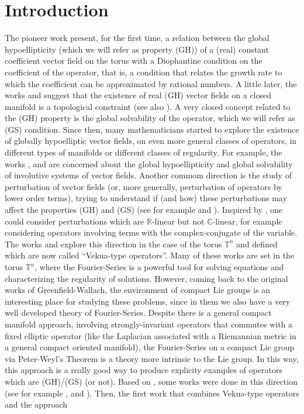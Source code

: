 \documentclass[sn-mathphys-num]{sn-jnl}%
\numberwithin{equation}{section}
\theoremstyle{thmstyleone}
\theoremstyle{thmstyletwo}
\theoremstyle{thmstylethree}
\begin{document}
\section{Introduction}

The pioneer work \cite{GW1972_pams} present, for the first time, a relation between the global hypoellipticity (which we will refer as property (GH)) of a (real) constant coefficient vector field on the torus with a Diophantine condition on the coefficient of the operator, that is, a condition that relates the growth rate to which the coefficient can be approximated by rational numbers. A little later, the works \cite{GW1973_tams} and \cite{greenfield1973globally} suggest that the existence of real (GH) vector fields on a closed manifold is a topological constraint (see also \cite{Forni08_cont-math}). A very closed concept related to the (GH) property is the global solvability of the operator, which we will refer as (GS) condition. Since then, many mathematicians started to explore the existence of globally hypoelliptic vector fields, on even more general classes of operators, in different types of manifolds or different classes of regularity. For example, the works \cite{CH1977_pams}, \cite{BP1999_jmaa} and \cite{DM2016_mana} are concerned about the global hypoellipticity and global solvability of involutive systems of vector fields. Another commom direction is the study of perturbation of vector fields (or, more generally, perturbation of operators by lower order terms), trying to understand if (and how) these perturbations may affect the properties (GH) and (GS) (see for example \cite{AK2019_jst} and \cite{KMP2021_jde}). Inspired by \cite{vekua2014generalized}, one could consider perturbations which are $\mathbb{R}$-linear but not $\mathbb{C}$-linear, for example considering operators involving terms with the complex-conjugate of the variable. The works \cite{bergamasco2014solvability} and \cite{de2021solvability} explore this direction in the case of the torus $\mathbb{T}^n$ and defined which are now called ``Vekua-type operators''. Many of these works are set in the torus $\mathbb{T}^n$, where the Fourier-Series is a powerful tool for solving equations and characterizing the regularity of solutions. However, coming back to the original works of Greenfield-Wallach, the environment of compact Lie groups is an interesting place for studying these problems, since in them we also have a very well developed theory of Fourier-Series. Despite there is a general compact manifold approach, involving strongly-invariant operators that commutes with a fixed elliptic operator (like the Laplacian associated with a Riemannian metric in a general compact oriented manifold), the Fourier-Series on a compact Lie group via Peter-Weyl's Theorem is a theory more intrinsic to the Lie group. In this way, this approach is a really good way to produce explicity examples of operators which are (GH)/(GS) (or not). Based on \cite{RT2010_book}, some works were done in this direction (see for example \cite{KMR2020_bsm}, \cite{KMR2021_jfa} and \cite{KKM2024}). Then, the first work that combines Vekua-type operators and the approach 
\end{document}
